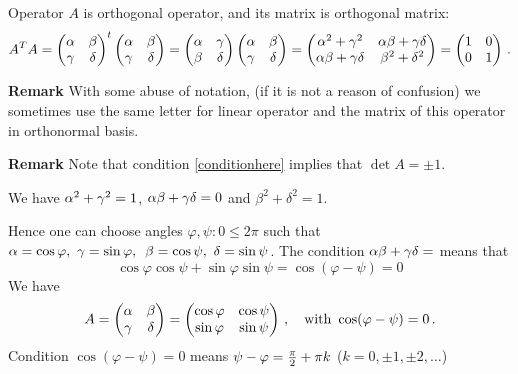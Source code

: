 \documentclass[12pt]{article}
\numberwithin{equation}{section}
\begin{document}
Operator $A$ is orthogonal operator, and its matrix is orthogonal matrix:
      \begin{equation}\label{conditionhere}    
A^TA=\begin{pmatrix}
      \alpha & \beta \\
      \gamma & \delta\\
       \end{pmatrix}^t
       \begin{pmatrix}
      \alpha & \beta \\
      \gamma & \delta\\
       \end{pmatrix}=
       \begin{pmatrix}
      \alpha & \gamma \\
      \beta & \delta\\
       \end{pmatrix}
       \begin{pmatrix}
      \alpha & \beta \\
      \gamma & \delta\\
       \end{pmatrix}=
       \begin{pmatrix}
      \alpha^2+\gamma^2 & \alpha\beta+\gamma\delta \\
      \alpha\beta+\gamma\delta & \beta^2+\delta^2\\
       \end{pmatrix}=
       \begin{pmatrix}
      1 & 0 \\
      0& 1\\
       \end{pmatrix}\,.
\end{equation}

{\bf Remark} With some abuse of notation,
 (if it is not a reason of confusion)
we sometimes use the same letter
for linear operator and the matrix of this operator in orthonormal basis.

\smallskip


 {\bf Remark} Note that condition \eqref{conditionhere} 
implies that $\det  A=\pm 1$.

\smallskip

 We have  $\alpha^2+\gamma^2=1$, $\alpha\beta+\gamma\delta=0$ and $\beta^2+\delta^2=1$.

  Hence one can choose angles
  $\varphi,\psi \colon 0\leq 2\pi$ such that
               $\alpha=\cos\varphi,\,\,\gamma=\sin\varphi,\,\,\,
\beta=\cos\psi,\,\,\delta=\sin\psi$.
 The condition  $\alpha\beta+\gamma\delta=$ means that
                 $$
            \cos\varphi\cos\psi+ \sin\varphi\sin\psi=\cos(\varphi-\psi)=0
                 $$
    We have
                   $$
      A=\begin{pmatrix}
          \alpha & \beta\cr 
          \gamma & \delta\cr 
              \end{pmatrix}
              =
      \begin{pmatrix}
          \cos\varphi  & \cos\psi\cr 
          \sin\varphi & \sin\psi\cr 
              \end{pmatrix}\,,\quad {\rm with}\,\,
                  \cos (\varphi-\psi)=0\,.
                   $$
Condition $\cos(\varphi-\psi)=0$  means $\psi-\varphi={\pi\over 2}+\pi k$
($k=0,\pm 1,\pm 2,\dots$)
\end{document}
